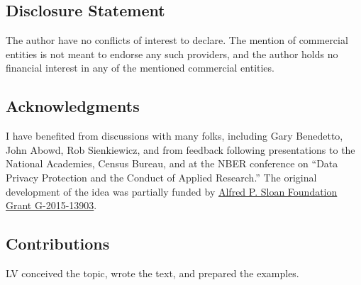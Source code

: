 \documentclass{article}
\begin{document}
\subsection*{Disclosure Statement}
The author have no conflicts of interest to declare. The mention of commercial entities is not meant to endorse any such providers, and the author holds no financial interest in any of the mentioned commercial entities.

\subsection*{Acknowledgments}

I have benefited from discussions with many folks, including Gary Benedetto, John Abowd, Rob Sienkiewicz, and from feedback following presentations to the National Academies, Census Bureau, and at the NBER conference on ``Data Privacy Protection and the Conduct of Applied Research.'' The original development of the idea was partially funded by \href{https://sloan.org/grant-detail/6845}{Alfred P. Sloan Foundation Grant G-2015-13903}.

\subsection*{Contributions}

LV conceived the topic, wrote the text, and prepared the examples.







\end{document}
